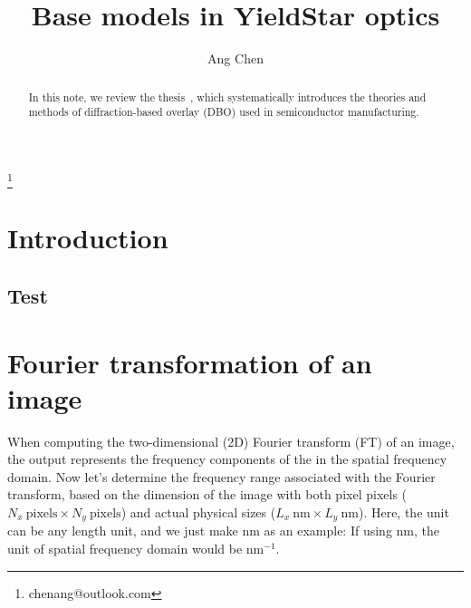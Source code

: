 \documentclass[pra,superscriptaddress,reprint,a4paper]{revtex4-1}
\begin{document}
\title{\Large Base models in YieldStar optics}

\author{Ang Chen}
\thanks{chenang@outlook.com}


\begin{abstract}
In this note, we review the thesis~\cite{swinkels2021spectral}, which systematically introduces the theories and methods
of diffraction-based overlay (DBO) used in semiconductor manufacturing.
\end{abstract}

\maketitle


\section{Introduction~\label{sec:1}}
\subsection{Test}




\appendix

\section{Fourier transformation of an image~\label{sec-a:ft-an0image}}
When computing the two-dimensional (2D) Fourier transform (FT) of an image, the output represents the frequency
components of the  in the spatial frequency domain.
Now let's determine the frequency range associated with the Fourier transform, based on the dimension of the image
with both pixel pixels ($N_x~\text{pixels}\times N_y~\text{pixels}$) 
and actual physical sizes ($L_x~\text{nm}\times L_y~\text{nm}$).
Here, the unit can be any length unit, and we just make nm as an example: 
If using nm, the unit of spatial frequency domain would be nm$^{-1}$.
\end{document}
